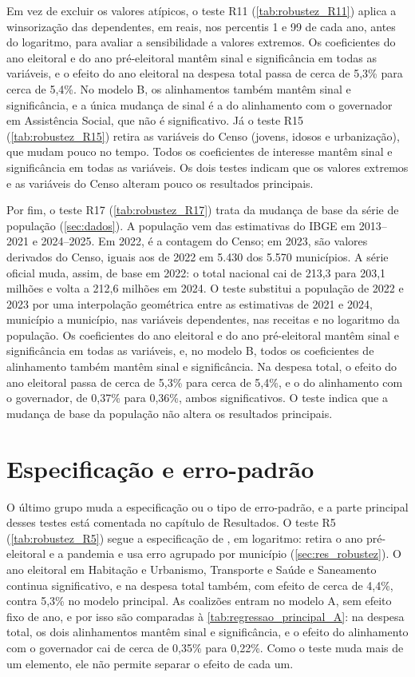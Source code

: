 Em vez de excluir os valores atípicos, o teste R11 (\autoref{tab:robustez_R11}) aplica a winsorização das dependentes, em reais, nos percentis 1 e 99 de cada ano, antes do logaritmo, para avaliar a sensibilidade a valores extremos. Os coeficientes do ano eleitoral e do ano pré-eleitoral mantêm sinal e significância em todas as variáveis, e o efeito do ano eleitoral na despesa total passa de cerca de 5,3\% para cerca de 5,4\%. No modelo B, os alinhamentos também mantêm sinal e significância, e a única mudança de sinal é a do alinhamento com o governador em Assistência Social, que não é significativo. Já o teste R15 (\autoref{tab:robustez_R15}) retira as variáveis do Censo (jovens, idosos e urbanização), que mudam pouco no tempo. Todos os coeficientes de interesse mantêm sinal e significância em todas as variáveis. Os dois testes indicam que os valores extremos e as variáveis do Censo alteram pouco os resultados principais.

Por fim, o teste R17 (\autoref{tab:robustez_R17}) trata da mudança de base da série de população (\autoref{sec:dados}). A população vem das estimativas do IBGE em 2013--2021 e 2024--2025. Em 2022, é a contagem do Censo; em 2023, são valores derivados do Censo, iguais aos de 2022 em 5.430 dos 5.570 municípios. A série oficial muda, assim, de base em 2022: o total nacional cai de 213,3 para 203,1 milhões e volta a 212,6 milhões em 2024. O teste substitui a população de 2022 e 2023 por uma interpolação geométrica entre as estimativas de 2021 e 2024, município a município, nas variáveis dependentes, nas receitas e no logaritmo da população. Os coeficientes do ano eleitoral e do ano pré-eleitoral mantêm sinal e significância em todas as variáveis, e, no modelo B, todos os coeficientes de alinhamento também mantêm sinal e significância. Na despesa total, o efeito do ano eleitoral passa de cerca de 5,3\% para cerca de 5,4\%, e o do alinhamento com o governador, de 0,37\% para 0,36\%, ambos significativos. O teste indica que a mudança de base da população não altera os resultados principais.


\section{Especificação e erro-padrão}

O último grupo muda a especificação ou o tipo de erro-padrão, e a parte principal desses testes está comentada no capítulo de Resultados. O teste R5 (\autoref{tab:robustez_R5}) segue a especificação de \textcite{sakurai2009}, em logaritmo: retira o ano pré-eleitoral e a pandemia e usa erro agrupado por município (\autoref{sec:res_robustez}). O ano eleitoral em Habitação e Urbanismo, Transporte e Saúde e Saneamento continua significativo, e na despesa total também, com efeito de cerca de 4,4\%, contra 5,3\% no modelo principal. As coalizões entram no modelo A, sem efeito fixo de ano, e por isso são comparadas à \autoref{tab:regressao_principal_A}: na despesa total, os dois alinhamentos mantêm sinal e significância, e o efeito do alinhamento com o governador cai de cerca de 0,35\% para 0,22\%. Como o teste muda mais de um elemento, ele não permite separar o efeito de cada um.

